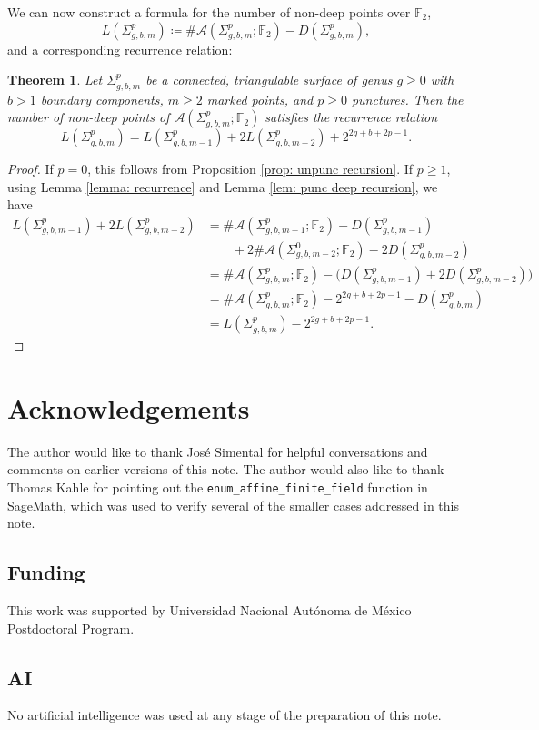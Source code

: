 \documentclass[reqno,12pt]{amsart}
\newtheorem{thm}{Theorem}[section]
\theoremstyle{definition}
\theoremstyle{remark}
\theoremstyle{remark}
\numberwithin{equation}{section}
\begin{document}
We can now construct a formula for the number of non-deep points over $\mathbb{F}_2$, 
\[ L(\Sigma_{g,b,m}^p) \coloneqq \#\mathcal{A}(\Sigma_{g,b,m}^p; \mathbb{F}_2) - D(\Sigma_{g,b,m}^p), \]
and a corresponding recurrence relation:
\begin{thm}\label{thm: nondeep recurrence}
	Let $\Sigma_{g,b,m}^p$ be a connected, triangulable surface of genus $g \geq 0$ with $b>1$ boundary components, $m\geq 2$ marked points, and $p\geq 0$ punctures. 
	Then the number of non-deep points of $\mathcal{A}(\Sigma_{g,b,m}^p; \mathbb{F}_2)$ satisfies the recurrence relation 
	\[ L(\Sigma_{g,b,m}^p) = L(\Sigma_{g,b,m-1}^p) + 2 L(\Sigma_{g,b,m-2}^p) + 2^{2g+b+2p-1}. \]
\end{thm}
\begin{proof}
	If $p=0$, this follows from Proposition \ref{prop: unpunc recursion}. If $p \geq 1$, using Lemma \ref{lemma: recurrence} and Lemma \ref{lem: punc deep recursion}, we have 
	\begin{align*}
		L(\Sigma_{g,b,m-1}^p) + 2 L(\Sigma_{g,b,m-2}^p) &= \#\mathcal{A}(\Sigma_{g,b,m-1}^p; \mathbb{F}_2) - D(\Sigma_{g,b,m-1}^p) \\ &\quad\quad + 2\#\mathcal{A}(\Sigma_{g,b,m-2}^0; \mathbb{F}_2) - 2D(\Sigma_{g,b,m-2}^p)\\
		&= \#\mathcal{A}(\Sigma_{g,b,m}^p; \mathbb{F}_2) - \big( D(\Sigma_{g,b,m-1}^p) + 2D(\Sigma_{g,b,m-2}^p) \big) \\
		&= \#\mathcal{A}(\Sigma_{g,b,m}^p; \mathbb{F}_2) - 2^{2g+b+2p-1} - D(\Sigma_{g,b,m}^p) \\ 
		&= L(\Sigma_{g,b,m}^p) - 2^{2g+b+2p-1}.
	\end{align*}
\end{proof}

\section*{Acknowledgements}

The author would like to thank Jos{\'e} Simental for helpful conversations and comments on earlier versions of this note. The author would also like to thank Thomas Kahle for pointing out the \verb|enum_affine_finite_field| function in SageMath, which was used to verify several of the smaller cases addressed in this note. 

\subsection*{Funding}

This work was supported by Universidad Nacional Aut{\'o}noma de M{\'e}xico Postdoctoral Program. 

\subsection*{AI}

No artificial intelligence was used at any stage of the preparation of this note. 



\end{document}
